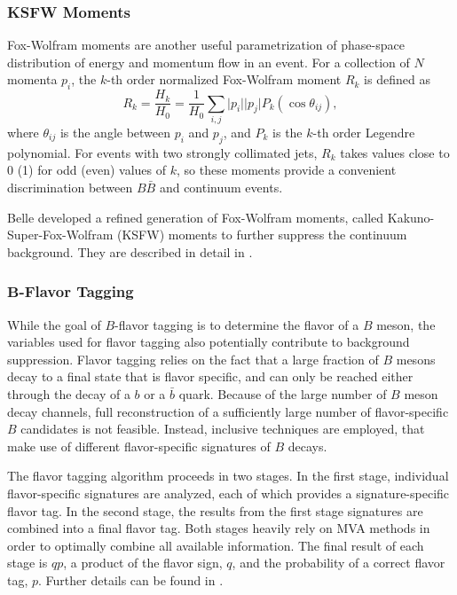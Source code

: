 \subsubsection{KSFW Moments}
Fox-Wolfram moments are another useful parametrization of phase-space distribution of energy and momentum flow in an event. For a collection of $N$ momenta $p_i$, the $k$-th order normalized Fox-Wolfram moment $R_k$ is defined as
\begin{equation}
R_k = \frac{H_k}{H_0} = \frac{1}{H_0} \sum_{i,j} \vert p_i \vert \vert p_j \vert P_k(\cos \theta_{ij}),
\end{equation}
where $\theta_{ij}$ is the angle between $p_i$ and $p_j$, and $P_k$ is the $k$-th order Legendre polynomial. For events with two strongly collimated jets, $R_k$ takes values close to 0 (1) for odd (even) values of $k$, so these moments provide a convenient discrimination between $B \bar B$ and continuum events.

Belle developed a refined generation of Fox-Wolfram moments, called Kakuno-Super-Fox-Wolfram (KSFW) moments to further suppress the continuum background. They are described in detail in \cite{bevan2014physics}.

\subsubsection{\texorpdfstring{$\bm{B}$-Flavor Tagging}{B-Flavor Tagging}}
While the goal of $B$-flavor tagging is to determine the flavor of a $B$ meson, the variables used for flavor tagging also potentially contribute to background suppression. Flavor tagging relies on the fact that a large fraction of $B$ mesons decay to a final state that is flavor specific, and can  only  be   reached  either through the decay of a $b$ or a $\bar b$ quark. Because  of  the  large  number  of $B$ meson decay  channels, full reconstruction of a sufficiently large number of flavor-specific $B$ candidates  is  not  feasible. Instead,  inclusive  techniques  are  employed, that  make  use  of  different
flavor-specific signatures of $B$ decays. 

The flavor tagging algorithm proceeds in two stages. In the first stage, individual flavor-specific signatures are analyzed, each of which provides a signature-specific flavor tag.  In  the  second  stage,  the  results from the first stage signatures are combined into a final flavor  tag.  Both  stages  heavily rely on MVA  methods in order to optimally combine all available information. The final result of each stage is $qp$, a product of the flavor sign, $q$, and the probability of a correct flavor tag, $p$. Further details can be found in \cite{bevan2014physics}.

